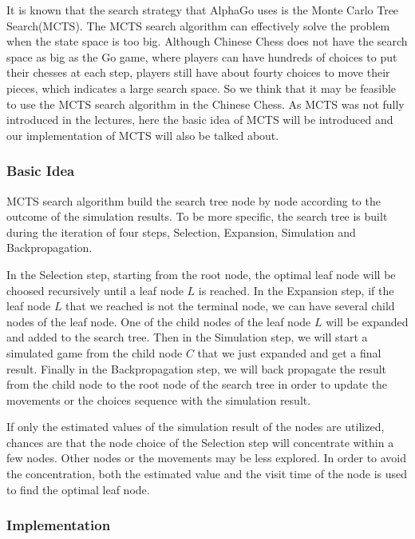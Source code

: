 It is known that the search strategy that AlphaGo uses is the Monte Carlo Tree Search(MCTS). 
The MCTS search algorithm can effectively solve the problem when the state space is too big. 
Although Chinese Chess does not have the search space as big as the Go game, where players can have hundreds of choices to put their chesses at each step, players still have about fourty choices to move their pieces, which indicates a large search space. 
So we think that it may be feasible to use the MCTS search algorithm in the Chinese Chess. 
As MCTS was not fully introduced in the lectures, here the basic idea of MCTS will be introduced and our implementation of MCTS will also be talked about. 
\subsubsection{Basic Idea}
MCTS search algorithm build the search tree node by node according to the outcome of the simulation results. 
To be more specific, the search tree is built during the iteration of four steps, Selection, Expansion, Simulation and Backpropagation. 

In the Selection step, starting from the root node, the optimal leaf node will be choosed recursively until a leaf node $L$ is reached. 
In the Expansion step, if the leaf node $L$ that we reached is not the terminal node, we can have several child nodes of the leaf node. 
One of the child nodes of the leaf node $L$ will be expanded and added to the search tree. 
Then in the Simulation step, we will start a simulated game from the child node $C$ that we just expanded and get a final result. 
Finally in the Backpropagation step, we will back propagate the result from the child node to the root node of the search tree in order to update the movements or the choices sequence with the simulation result. 

If only the estimated values of the simulation result of the nodes are utilized, chances are that the node choice of the Selection step will concentrate within a few nodes. 
Other nodes or the movements may be less explored. 
In order to avoid the concentration, both the estimated value and the visit time of the node is used to find the optimal leaf node. 
\subsubsection{Implementation}